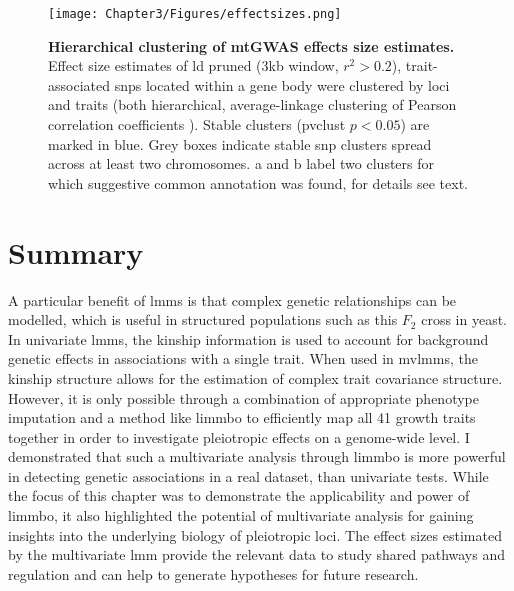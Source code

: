 \begin{figure}[hbtp]
	\centering
	\texttt{[image: Chapter3/Figures/effectsizes.png]}
	\caption[\textbf{Hierarchical clustering of mtGWAS effects size estimates.}]{\textbf{Hierarchical clustering of mtGWAS effects size estimates.} Effect size estimates of \gls{ld} pruned (\num{3}kb window, \(r^2 > 0.2\)), trait-associated \glspl{snp} located within a gene body were clustered by loci and traits (both hierarchical, average-linkage clustering of Pearson correlation coefficients ). Stable clusters (pvclust \( p < 0.05\)) are marked in blue. Grey boxes indicate stable \gls{snp} clusters spread across at least two chromosomes. a and b label two clusters for which suggestive common annotation was found, for details see text.}
 	\label{fig:effectsizes}
\end{figure}

\section{Summary}
A particular benefit of \glspl{lmm} is that complex genetic relationships can be modelled, which is useful in structured populations such as this \(F_2\) cross in yeast. In univariate \glspl{lmm}, the kinship information is used to account for background genetic effects in associations with a single trait. When used in \glspl{mvlmm}, the kinship structure allows for the estimation of complex trait covariance structure. However, it is only possible through a combination of appropriate phenotype imputation and a method like \gls{limmbo} to efficiently map all \num{41} growth traits together in order to investigate pleiotropic effects on a genome-wide level. I demonstrated that such a multivariate analysis through \gls{limmbo} is more powerful in detecting genetic associations in a real dataset, than univariate tests. While the focus of this chapter was to demonstrate the applicability and power of \gls{limmbo}, it also highlighted the potential of multivariate analysis for gaining insights into the underlying biology of pleiotropic loci. The effect sizes estimated by the multivariate \gls{lmm} provide the relevant data to study shared pathways and regulation and can help to generate hypotheses for future research.
